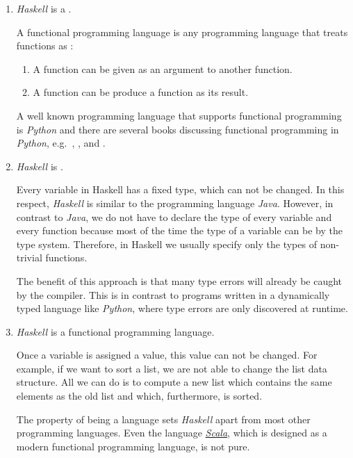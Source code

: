 \begin{enumerate}
\item \textsl{Haskell} is a .

  A functional programming language is any programming language that treats functions as
  :
  \begin{enumerate}
  \item A function can be given as an argument to another function.
  \item A function can be produce a function as its result.
  \end{enumerate}
  A well known programming language that supports functional programming is \textsl{Python} and there are
  several books discussing functional programming in \textsl{Python}, e.g.~\cite{lott:2022}, \cite{mertz:2015},
  and \cite{reid:2023}.  

\item \textsl{Haskell} is .

  Every variable in Haskell has a fixed type, which can not be changed.  In this respect, \textsl{Haskell} is
  similar to the programming language \textsl{Java}.  However, in contrast to \textsl{Java}, we do not have to
  declare the type of every variable and every function because most of the time the type of a variable can be
   by the type system.  Therefore, in Haskell we usually specify only the types of non-trivial
  functions.

  The benefit of this approach is that many type errors will already be caught by the compiler.  This is in
  contrast to programs written in a dynamically typed language like \textsl{Python}, where type errors are only
  discovered at runtime.

\item \textsl{Haskell} is a  functional programming language.

  Once a variable is assigned a value, this value can not be changed.  For example, if we want to sort a list,
  we are not able to change the list data structure.  All we can do is to compute a new list which contains the
  same elements as the old list and which, furthermore, is sorted.

  The property of being a  language sets \textsl{Haskell} apart from most other programming
  languages.  Even the language
  \href{https://en.wikipedia.org/wiki/Scala_(programming_language)}{\textsl{Scala}}, which is designed as a
  modern functional programming language, is not pure.


\end{enumerate}
